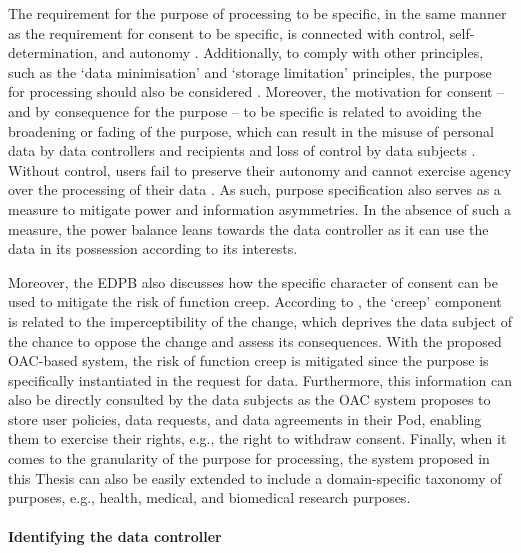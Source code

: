 The requirement for the purpose of processing to be specific, in the same manner as the requirement for consent to be specific, is connected with control, self-determination, and autonomy \citep{koning_purpose_2020}. 
Additionally, to comply with other principles, such as the `data minimisation' and `storage limitation' principles, the purpose for processing should also be considered \citep{koning_purpose_2020}.
Moreover, the motivation for consent -- and by consequence for the purpose -- to be specific is related to avoiding the broadening or fading of the purpose, which can result in the misuse of personal data by data controllers and recipients and loss of control by data subjects \citep{european_data_protection_board_guidelines_2020}.
Without control, users fail to preserve their autonomy and cannot exercise agency over the processing of their data \citep{jarovsky_improving_2018}.
As such, purpose specification also serves as a measure to mitigate power and information asymmetries.
In the absence of such a measure, the power balance leans towards the data controller as it can use the data in its possession according to its interests.

Moreover, the EDPB also discusses how the specific character of consent can be used to mitigate the risk of function creep.
According to \cite{koops_concept_2021}, the `creep' component is related to the imperceptibility of the change, which deprives the data subject of the chance to oppose the change and assess its consequences.
With the proposed OAC-based system, the risk of function creep is mitigated since the purpose is specifically instantiated in the request for data.
Furthermore, this information can also be directly consulted by the data subjects as the OAC system proposes to store user policies, data requests, and data agreements in their Pod, enabling them to exercise their rights, e.g., the right to withdraw consent.
Finally, when it comes to the granularity of the purpose for processing, the system proposed in this Thesis can also be easily extended to include a domain-specific taxonomy of purposes, e.g., health, medical, and biomedical research purposes.

\paragraph{Identifying the data controller}

